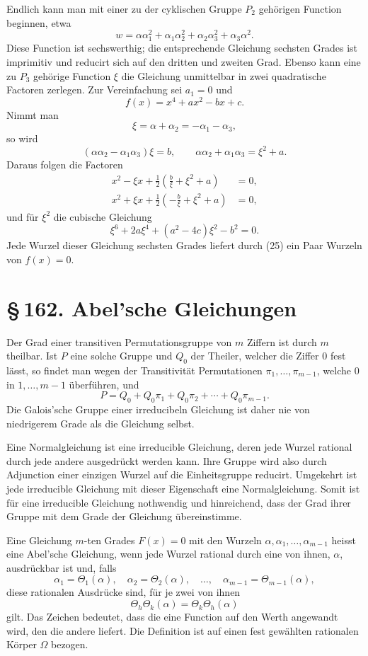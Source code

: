 \documentclass[11pt]{article}
\providecommand{\sect}[2]{\section*{\S\,#1. #2}}
\begin{document}
Endlich kann man mit einer zu der cyklischen Gruppe $P_2$ gehörigen Function beginnen, etwa
\[
        w=\alpha\alpha_1^2+\alpha_1\alpha_2^2+
          \alpha_2\alpha_3^2+\alpha_3\alpha^2.                         \tag{21}
\]
Diese Function ist sechswerthig; die entsprechende Gleichung sechsten Grades ist imprimitiv und reducirt sich auf den dritten und zweiten Grad. Ebenso kann eine zu $P_3$ gehörige Function $\xi$ die Gleichung unmittelbar in zwei quadratische Factoren zerlegen. Zur Vereinfachung sei $a_1=0$ und
\[
        f(x)=x^4+ax^2-bx+c.                                           \tag{23}
\]
Nimmt man
\[
        \xi=\alpha+\alpha_2=-\alpha_1-\alpha_3,                         \tag{22}
\]
so wird
\[
        (\alpha\alpha_2-\alpha_1\alpha_3)\xi=b,
        \qquad
        \alpha\alpha_2+\alpha_1\alpha_3=\xi^2+a.
\]
Daraus folgen die Factoren
\[
\begin{aligned}
        x^2-\xi x+\frac12\left(\frac b\xi+\xi^2+a\right)&=0,\\
        x^2+\xi x+\frac12\left(-\frac b\xi+\xi^2+a\right)&=0,
\end{aligned}                                                          \tag{25}
\]
und für $\xi^2$ die cubische Gleichung
\[
        \xi^6+2a\xi^4+(a^2-4c)\xi^2-b^2=0.                             \tag{26}
\]
Jede Wurzel dieser Gleichung sechsten Grades liefert durch (25) ein Paar Wurzeln von $f(x)=0$.

\sect{162}{Abel'sche Gleichungen}

Der Grad einer transitiven Permutationsgruppe von $m$ Ziffern ist durch $m$ theilbar. Ist $P$ eine solche Gruppe und $Q_0$ der Theiler, welcher die Ziffer $0$ fest lässt, so findet man wegen der Transitivität Permutationen $\pi_1,\ldots,\pi_{m-1}$, welche $0$ in $1,\ldots,m-1$ überführen, und
\[
        P=Q_0+Q_0\pi_1+Q_0\pi_2+\cdots+Q_0\pi_{m-1}.                  \tag{1}
\]
Die Galois'sche Gruppe einer irreducibeln Gleichung ist daher nie von niedrigerem Grade als die Gleichung selbst.

Eine Normalgleichung ist eine irreducible Gleichung, deren jede Wurzel rational durch jede andere ausgedrückt werden kann. Ihre Gruppe wird also durch Adjunction einer einzigen Wurzel auf die Einheitsgruppe reducirt. Umgekehrt ist jede irreducible Gleichung mit dieser Eigenschaft eine Normalgleichung. Somit ist für eine irreducible Gleichung nothwendig und hinreichend, dass der Grad ihrer Gruppe mit dem Grade der Gleichung übereinstimme.

Eine Gleichung $m$-ten Grades $F(x)=0$ mit den Wurzeln $\alpha,\alpha_1,\ldots,\alpha_{m-1}$ heisst eine Abel'sche Gleichung, wenn jede Wurzel rational durch eine von ihnen, $\alpha$, ausdrückbar ist und, falls
\[
        \alpha_1=\Theta_1(\alpha),\quad
        \alpha_2=\Theta_2(\alpha),\quad \ldots,\quad
        \alpha_{m-1}=\Theta_{m-1}(\alpha),                              \tag{2}
\]
diese rationalen Ausdrücke sind, für je zwei von ihnen
\[
        \Theta_h\Theta_k(\alpha)=\Theta_k\Theta_h(\alpha)                \tag{3}
\]
gilt. Das Zeichen bedeutet, dass die eine Function auf den Werth angewandt wird, den die andere liefert. Die Definition ist auf einen fest gewählten rationalen Körper $\Omega$ bezogen.
\end{document}

